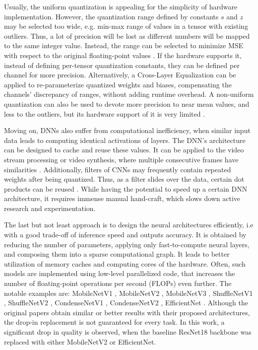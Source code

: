 Usually, the uniform quantization is appealing for the simplicity of hardware implementation. However, the quantization range defined by constants $s$ and $z$ may be selected too wide, e.g. min-max range of values in a tensor with existing outliers. Thus, a lot of precision will be lost as different numbers will be mapped to the same integer value. Instead, the range can be selected to minimize MSE with respect to the original floating-point values \cite{quant:mse19, speed:quant-error-analysis15}. If the hardware supports it, instead of defining per-tensor quantization constants, they can be defined per channel for more precision. Alternatively, a Cross-Layer Equalization \cite{quant:cle20} can be applied to re-parameterize quantized weights and biases, compensating the channels' discrepancy of ranges, without adding runtime overhead. A non-uniform quantization can also be used to devote more precision to near mean values, and less to the outliers, but its hardware support of it is very limited \cite{quant:non-uniform21}.

Moving on, DNNs also suffer from computational inefficiency, when similar input data leads to computing identical activations of layers. The DNN's architecture can be designed to cache and reuse these values. It can be applied to the video stream processing or video synthesis, where multiple consecutive frames have similarities \cite{aux:reusing19}. Additionally, filters of CNNs may frequently contain repeated weights after being quantized. Thus, as a filter slides over the data, certain dot products can be reused \cite{dnn:reusing18}. While having the potential to speed up a certain DNN architecture, it requires immense manual hand-craft, which slows down active research and experimentation.

The last but not least approach is to design the neural architectures efficiently, i.e with a good trade-off of inference speed and outputs accuracy. It is obtained by reducing the number of parameters, applying only fast-to-compute neural layers, and composing them into a sparse computational graph. It leads to better utilization of memory caches and computing cores of the hardware. Often, such models are implemented using low-level parallelized code, that increases the number of floating-point operations per second (FLOPs) even further. The notable examples are: MobileNetV1 \cite{dnn:mnv1-17}, MobileNetV2 \cite{dnn:mnv2-18}, MobileNetV3 \cite{dnn:mnv3-19},  ShuffleNetV1 \cite{dnn:shufflenetv1-18}, ShuffleNetV2 \cite{dnn:shufflenetv2-18}, CondenseNetV1 \cite{dnn:condensenetv1-18}, CondenseNetV2 \cite{dnn:condensenetv2-21}, EfficientNet \cite{dnn:efficientnetv1-19}. Although the original papers obtain similar or better results with their proposed architectures, the drop-in replacement is not guaranteed for every task. In this work, a significant drop in quality is observed, when the baseline ResNet18 backbone was replaced with either MobileNetV2 or EfficientNet.


